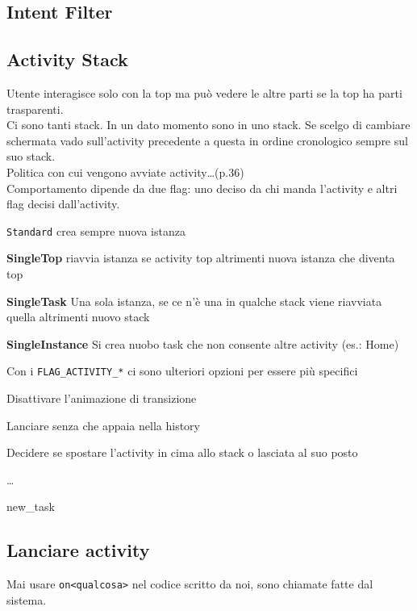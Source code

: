 \documentclass[10pt]{book}
\begin{document}
\subsection{Intent Filter}

\subsection{Activity Stack}
Utente interagisce solo con la top ma può vedere le altre parti se la top ha parti trasparenti.\\
Ci sono tanti stack. In un dato momento sono in uno stack. Se scelgo di cambiare schermata vado sull'activity precedente a questa in ordine cronologico sempre sul suo stack.\\
Politica con cui vengono avviate activity\ldots (p.36)\\
Comportamento dipende da due flag: uno deciso da chi manda l'activity e altri flag decisi dall'activity.\\
\begin{list}{}{\texttt{launchMode} (manifest)}
	\item \texttt{Standard} crea sempre nuova istanza
	\item \textbf{SingleTop} riavvia istanza se activity top altrimenti nuova istanza che diventa top
	\item \textbf{SingleTask} Una sola istanza, se ce n'è una in qualche stack viene riavviata quella altrimenti nuovo stack
	\item \textbf{SingleInstance} Si crea nuobo task che non consente altre activity (es.: Home)
\end{list}
Con i \texttt{FLAG\_ACTIVITY\_*} ci sono ulteriori opzioni per essere più specifici
\begin{list}{}{}
	\item Disattivare l'animazione di transizione
	\item Lanciare senza che appaia nella history
	\item Decidere se spostare l'activity in cima allo stack o lasciata al suo posto
	\item \ldots
\end{list}
\begin{list}{}{Flag più comuni (intent)}
	\item new\_task
	\item 
\end{list}
\subsection{Lanciare activity}
Mai usare \texttt{on<qualcosa>} nel codice scritto da noi, sono chiamate fatte dal sistema.
\end{document}
